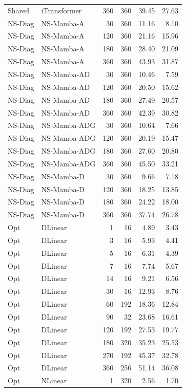 {\begin{longtable}{llrrrr}
Shared & iTransformer & 360 & 360 & 39.45 & 27.63 \\
NS-Diag & NS-Mamba-A & 30 & 360 & 11.16 & 8.10 \\
NS-Diag & NS-Mamba-A & 120 & 360 & 21.16 & 15.96 \\
NS-Diag & NS-Mamba-A & 180 & 360 & 28.40 & 21.09 \\
NS-Diag & NS-Mamba-A & 360 & 360 & 43.93 & 31.87 \\
NS-Diag & NS-Mamba-AD & 30 & 360 & 10.46 & 7.59 \\
NS-Diag & NS-Mamba-AD & 120 & 360 & 20.50 & 15.62 \\
NS-Diag & NS-Mamba-AD & 180 & 360 & 27.49 & 20.57 \\
NS-Diag & NS-Mamba-AD & 360 & 360 & 42.39 & 30.82 \\
NS-Diag & NS-Mamba-ADG & 30 & 360 & 10.64 & 7.66 \\
NS-Diag & NS-Mamba-ADG & 120 & 360 & 20.19 & 15.47 \\
NS-Diag & NS-Mamba-ADG & 180 & 360 & 27.60 & 20.80 \\
NS-Diag & NS-Mamba-ADG & 360 & 360 & 45.50 & 33.21 \\
NS-Diag & NS-Mamba-D & 30 & 360 & 9.66 & 7.18 \\
NS-Diag & NS-Mamba-D & 120 & 360 & 18.25 & 13.85 \\
NS-Diag & NS-Mamba-D & 180 & 360 & 24.22 & 18.00 \\
NS-Diag & NS-Mamba-D & 360 & 360 & 37.74 & 26.78 \\
Opt & DLinear & 1 & 16 & 4.89 & 3.43 \\
Opt & DLinear & 3 & 16 & 5.93 & 4.41 \\
Opt & DLinear & 5 & 16 & 6.31 & 4.39 \\
Opt & DLinear & 7 & 16 & 7.74 & 5.67 \\
Opt & DLinear & 14 & 16 & 9.21 & 6.56 \\
Opt & DLinear & 30 & 16 & 12.93 & 8.76 \\
Opt & DLinear & 60 & 192 & 18.36 & 12.84 \\
Opt & DLinear & 90 & 32 & 23.68 & 16.61 \\
Opt & DLinear & 120 & 192 & 27.53 & 19.77 \\
Opt & DLinear & 180 & 320 & 35.23 & 25.53 \\
Opt & DLinear & 270 & 192 & 45.37 & 32.78 \\
Opt & DLinear & 360 & 256 & 51.14 & 36.08 \\
Opt & NLinear & 1 & 320 & 2.56 & 1.70 \\

\end{longtable}}
